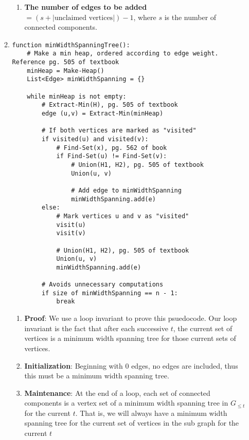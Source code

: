 \documentclass{article}
\begin{document}
\begin{enumerate}
\begin{enumerate}
\begin{enumerate}
                    \item \textbf{The number of edges to be added} 
                        $= \left(s + \left|\text{unclaimed vertices}\right|\right) - 1$, where $s$ is the number of
                        connected components.
                \end{enumerate}
                
            
            \item
                \begin{verbatim}
function minWidthSpanningTree():
    # Make a min heap, ordered according to edge weight. Reference pg. 505 of textbook
    minHeap = Make-Heap()
    List<Edge> minWidthSpanning = {}

    while minHeap is not empty:
        # Extract-Min(H), pg. 505 of textbook
        edge (u,v) = Extract-Min(minHeap)
        
        # If both vertices are marked as "visited"
        if visited(u) and visited(v):
            # Find-Set(x), pg. 562 of book
            if Find-Set(u) != Find-Set(v):
                # Union(H1, H2), pg. 505 of textbook
                Union(u, v)
                
                # Add edge to minWidthSpanning
                minWidthSpanning.add(e)
        else:
            # Mark vertices u and v as "visited"
            visit(u)
            visit(v)
            
            # Union(H1, H2), pg. 505 of textbook
            Union(u, v)
            minWidthSpanning.add(e)
        
        # Avoids unnecessary computations
        if size of minWidthSpanning == n - 1:
            break
                \end{verbatim}
            
                \begin{enumerate}
                    \item \textbf{Proof}: We use a loop invariant to prove this psuedocode. Our loop invariant is the fact that after each successive $t$, the current set of vertices is a minimum width spanning tree for those current sets of vertices.
                    
                    \item \textbf{Initialization}: Beginning with 0 edges, no edges are included, thus this must be a minimum width spanning tree.
                    
                    \item \textbf{Maintenance}: At the end of a loop, each set of connected components is a vertex set of a minimum width spanning tree in $G_{\leq t}$ for the current $t$. That is, we will always have a minimum width spanning tree for the current set of vertices in the sub graph for the current $t$
                    

\end{enumerate}
\end{enumerate}
\end{enumerate}
\end{document}
